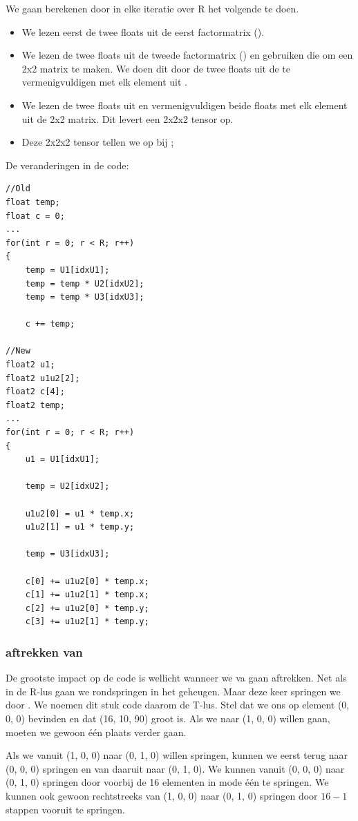 We gaan \CC{} berekenen door in elke iteratie over R het volgende te doen.
\begin{itemize}
    \item We lezen eerst de twee floats uit de eerst factormatrix ().
    \item We lezen de twee floats uit de tweede factormatrix () en gebruiken die om een 2x2 matrix te maken. We doen dit door de twee floats uit de  te vermenigvuldigen met elk element uit .
    \item We lezen de twee floats uit  en vermenigvuldigen beide floats met elk element uit de 2x2 matrix. Dit levert een 2x2x2 tensor op.
    \item Deze 2x2x2 tensor tellen we op bij \CC{};
\end{itemize}

De veranderingen in de code:
\begin{lstlisting}
//Old
float temp;
float c = 0;
...
for(int r = 0; r < R; r++)
{
	temp = U1[idxU1];
	temp = temp * U2[idxU2];
	temp = temp * U3[idxU3];

	c += temp;

//New
float2 u1;
float2 u1u2[2];
float2 c[4];
float2 temp;
...
for(int r = 0; r < R; r++)
{ 
	u1 = U1[idxU1];

	temp = U2[idxU2];

	u1u2[0] = u1 * temp.x;
	u1u2[1] = u1 * temp.y;

	temp = U3[idxU3];

	c[0] += u1u2[0] * temp.x;
	c[1] += u1u2[1] * temp.x;
	c[2] += u1u2[0] * temp.y;
	c[3] += u1u2[1] * temp.y;
\end{lstlisting}

\subsubsection{\TT{} aftrekken van \CC{}}
De grootste impact op de code is wellicht wanneer we \TT{} va \CC{} gaan aftrekken.  Net als in de R-lus gaan we rondspringen in het geheugen. Maar deze keer springen we door \TT{}.  We noemen dit stuk code daarom de T-lus. Stel dat we ons op element (0, 0, 0) bevinden en dat \TT{} (16, 10, 90) groot is. Als we naar (1, 0, 0) willen gaan, moeten we gewoon \'e\'en plaats verder gaan.

Als we vanuit (1, 0, 0) naar (0, 1, 0) willen springen, kunnen we eerst terug naar (0, 0, 0) springen en van daaruit naar (0, 1, 0). We kunnen vanuit (0, 0, 0) naar (0, 1, 0) springen door voorbij de 16 elementen in mode \'e\'en te springen. We kunnen ook gewoon rechtstreeks van (1, 0, 0) naar (0, 1, 0) springen door $16-1$ stappen vooruit te springen.

